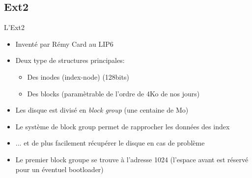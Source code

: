 \subsection{Ext2}

\begin{frame}[fragile=singleslide]{L'Ext2}
  \begin{itemize}
  \item Inventé par Rémy Card au LIP6
  \item Deux type de structures principales:
    \begin{itemize}
    \item Des inodes (index-node) (128bits)
    \item Des blocks (paramètrable de l'ordre de 4Ko de nos jours)
    \end{itemize}
  \item Les disque  est divisé en \emph{block group}  (une centaine de
    Mo)
  \item Le système de block group permet de rapprocher les données des
    index
  \item  ... et  de  plus facilement  récupérer  le disque  en cas  de
    problème
  \item Le premier  block groupe se trouve à  l'adresse 1024 (l'espace
    avant est réservé pour un éventuel bootloader)
  \end{itemize}
\end{frame}

